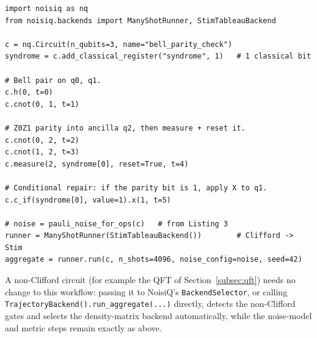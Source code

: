\documentclass[10pt,twocolumn]{article}
\begin{document}
\begin{lstlisting}[style=noisiqpython, caption={The Bell parity-check circuit
with a mid-circuit measurement (\texttt{measure(..., reset=True)}) and a
conditional correction (\texttt{c\_if(...).x(...)}). \texttt{syndrome[0]} is a
classical bit allocated on the circuit.}, label={lst:bell}]
import noisiq as nq
from noisiq.backends import ManyShotRunner, StimTableauBackend
 
c = nq.Circuit(n_qubits=3, name="bell_parity_check")
syndrome = c.add_classical_register("syndrome", 1)   # 1 classical bit
 
# Bell pair on q0, q1.
c.h(0, t=0)
c.cnot(0, 1, t=1)
 
# Z0Z1 parity into ancilla q2, then measure + reset it.
c.cnot(0, 2, t=2)
c.cnot(1, 2, t=3)
c.measure(2, syndrome[0], reset=True, t=4)
 
# Conditional repair: if the parity bit is 1, apply X to q1.
c.c_if(syndrome[0], value=1).x(1, t=5)
 
# noise = pauli_noise_for_ops(c)   # from Listing 3
runner = ManyShotRunner(StimTableauBackend())        # Clifford -> Stim
aggregate = runner.run(c, n_shots=4096, noise_config=noise, seed=42)
\end{lstlisting}
 
\noindent
A non-Clifford circuit (for example the QFT of Section~\ref{subsec:qft}) needs
no change to this workflow: passing it to NoisiQ's \texttt{BackendSelector}, or
calling \texttt{TrajectoryBackend().run\_aggregate(...)} directly, detects the
non-Clifford gates and selects the density-matrix backend automatically, while
the noise-model and metric steps remain exactly as above.
\end{document}
